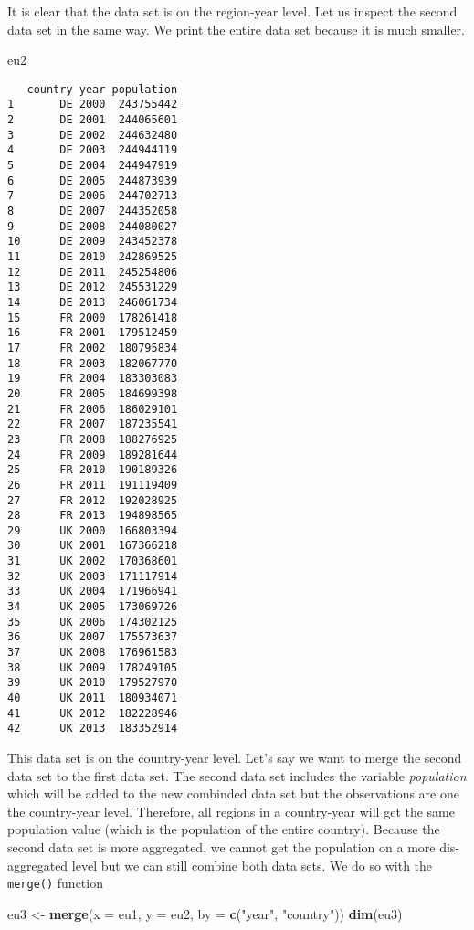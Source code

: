 \documentclass[]{article}
\newenvironment{Shaded}{\begin{snugshade}}{\end{snugshade}}
\newcommand{\DataTypeTok}[1]{\textcolor[rgb]{0.13,0.29,0.53}{#1}}
\newcommand{\KeywordTok}[1]{\textcolor[rgb]{0.13,0.29,0.53}{\textbf{#1}}}
\newcommand{\NormalTok}[1]{#1}
\newcommand{\StringTok}[1]{\textcolor[rgb]{0.31,0.60,0.02}{#1}}
\begin{document}
It is clear that the data set is on the region-year level. Let us inspect the second data set in the same way. We print the entire data set because it is much smaller.

\begin{Shaded}
\begin{Highlighting}[]
\NormalTok{eu2}
\end{Highlighting}
\end{Shaded}

\begin{verbatim}
   country year population
1       DE 2000  243755442
2       DE 2001  244065601
3       DE 2002  244632480
4       DE 2003  244944119
5       DE 2004  244947919
6       DE 2005  244873939
7       DE 2006  244702713
8       DE 2007  244352058
9       DE 2008  244080027
10      DE 2009  243452378
11      DE 2010  242869525
12      DE 2011  245254806
13      DE 2012  245531229
14      DE 2013  246061734
15      FR 2000  178261418
16      FR 2001  179512459
17      FR 2002  180795834
18      FR 2003  182067770
19      FR 2004  183303083
20      FR 2005  184699398
21      FR 2006  186029101
22      FR 2007  187235541
23      FR 2008  188276925
24      FR 2009  189281644
25      FR 2010  190189326
26      FR 2011  191119409
27      FR 2012  192028925
28      FR 2013  194898565
29      UK 2000  166803394
30      UK 2001  167366218
31      UK 2002  170368601
32      UK 2003  171117914
33      UK 2004  171966941
34      UK 2005  173069726
35      UK 2006  174302125
36      UK 2007  175573637
37      UK 2008  176961583
38      UK 2009  178249105
39      UK 2010  179527970
40      UK 2011  180934071
41      UK 2012  182228946
42      UK 2013  183352914
\end{verbatim}

This data set is on the country-year level. Let's say we want to merge the second data set to the first data set. The second data set includes the variable \emph{population} which will be added to the new combinded data set but the observations are one the country-year level. Therefore, all regions in a country-year will get the same population value (which is the population of the entire country). Because the second data set is more aggregated, we cannot get the population on a more dis-aggregated level but we can still combine both data sets. We do so with the \texttt{merge()} function

\begin{Shaded}
\begin{Highlighting}[]
\NormalTok{eu3 <-}\StringTok{ }\KeywordTok{merge}\NormalTok{(}\DataTypeTok{x =}\NormalTok{ eu1, }\DataTypeTok{y =}\NormalTok{ eu2, }\DataTypeTok{by =} \KeywordTok{c}\NormalTok{(}\StringTok{"year"}\NormalTok{, }\StringTok{"country"}\NormalTok{))}
\KeywordTok{dim}\NormalTok{(eu3)}
\end{Highlighting}
\end{Shaded}
\end{document}
